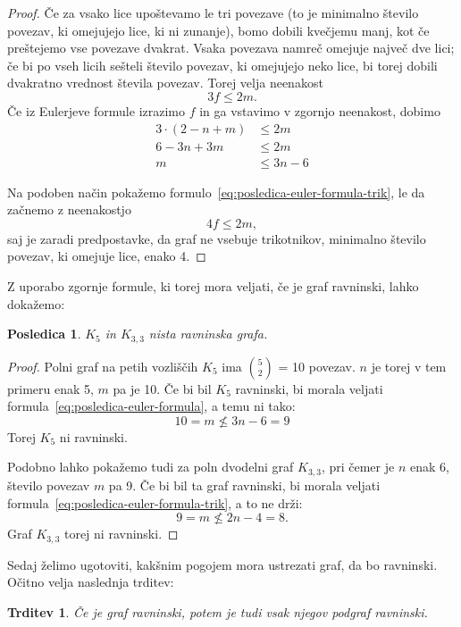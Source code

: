 \documentclass[12pt,a4paper]{amsart}
\theoremstyle{definition} %
\theoremstyle{plain} %
\newtheorem{trditev}[definicija]{Trditev}
\newtheorem{posledica}[definicija]{Posledica}
\begin{document}
\begin{proof}
    Če za vsako lice upoštevamo le tri povezave (to je minimalno število povezav, ki omejujejo lice, ki ni zunanje), bomo dobili kvečjemu manj, kot če preštejemo vse povezave dvakrat.
    Vsaka povezava namreč omejuje največ dve lici; če bi po vseh licih sešteli število povezav, ki omejujejo neko lice, bi torej dobili dvakratno vrednost števila povezav.
    Torej velja neenakost
    \[ 3f \leq 2m .\]
    Če iz Eulerjeve formule izrazimo $f$ in ga vstavimo v zgornjo neenakost, dobimo
    \begin{align*}
        3\cdot(2-n+m) &\leq 2m \\
        6 - 3n + 3m &\leq 2m \\
        m &\leq 3n - 6
    \end{align*}
    
    Na podoben način pokažemo formulo~\eqref{eq:posledica-euler-formula-trik}, le da začnemo z neenakostjo 
    \[ 4f \leq 2m, \]
    saj je zaradi predpostavke, da graf ne vsebuje trikotnikov, minimalno število povezav, ki omejuje lice, enako 4. 
\end{proof}

Z uporabo zgornje formule, ki torej mora veljati, če je graf ravninski, lahko dokažemo:
\begin{posledica}
    \label{posl:neravninska-grafa}
    $K_5$ in $K_{3,3}$ nista ravninska grafa.
\end{posledica}

\begin{proof}
    Polni graf na petih vozliščih $K_5$ ima {$5 \choose 2$} = 10 povezav. $n$ je torej v tem primeru enak
    5, $m$ pa je 10. Če bi bil $K_5$ ravninski, bi morala veljati formula~\eqref{eq:posledica-euler-formula},
    a temu ni tako:
    \[ 10 = m \nleq 3n - 6 = 9 \]
    Torej $K_5$ ni ravninski.
    
    Podobno lahko pokažemo tudi za poln dvodelni graf $K_{3,3}$, pri čemer je $n$ enak 6, število povezav $m$ pa 9. Če bi bil ta graf ravninski, bi morala veljati formula~\eqref{eq:posledica-euler-formula-trik}, a to ne drži:
    \[ 9 = m \nleq 2n - 4 = 8. \] 
    Graf $K_{3,3}$ torej ni ravninski. \qedhere
\end{proof}

Sedaj želimo ugotoviti, kakšnim pogojem mora ustrezati graf, da bo ravninski. Očitno velja naslednja trditev:

\begin{trditev}
    \label{trd:podgraf}
    Če je graf ravninski, potem je tudi vsak njegov podgraf ravninski. %
\end{trditev}
\end{document}
